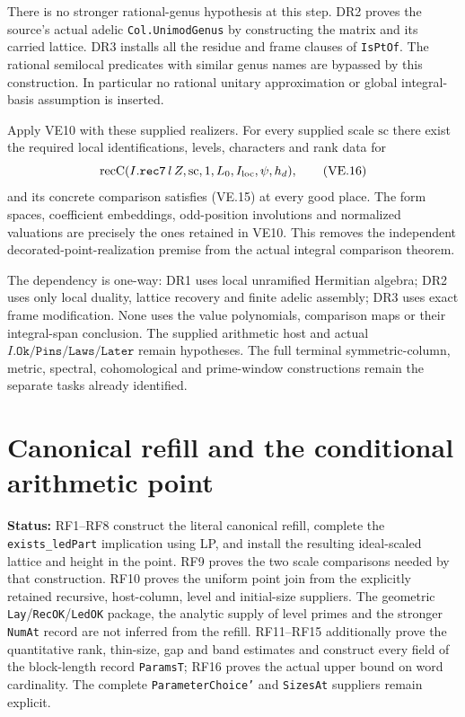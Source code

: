 \documentclass[11pt,a4paper]{article}
\numberwithin{equation}{section}
\theoremstyle{remark}\newtheorem{remark}[theorem]{Remark}
\newcommand{\status}[1]{\textbf{Status:} #1}
\begin{document}
There is no stronger rational-genus hypothesis at this step.
DR2 proves the source's actual adelic \texttt{Col.UnimodGenus}
by constructing the matrix and its carried lattice. DR3 installs
all the residue and frame clauses of \texttt{IsPtOf}. The rational
semilocal predicates with similar genus names are bypassed by this
construction. In particular no rational unitary approximation or
global integral-basis assumption is inserted.

Apply VE10 with these supplied realizers. For every supplied scale
$\mathrm{sc}$ there exist the required local identifications, levels,
characters and rank data for
\[
 \operatorname{recC}(I.\texttt{rec7}\,l\,Z,
                  \mathrm{sc},1,L_0,I_{\rm loc},\psi,h_d),
                                                        \tag{VE.16}
\]
and its concrete comparison satisfies (VE.15) at every good place.
The form spaces, coefficient embeddings, odd-position involutions
and normalized valuations are precisely the ones retained in VE10.
This removes the independent decorated-point-realization premise
from the actual integral comparison theorem.

The dependency is one-way: DR1 uses local unramified Hermitian algebra;
DR2 uses only local duality, lattice recovery and finite adelic assembly;
DR3 uses exact frame modification. None uses the value polynomials,
comparison maps or their integral-span conclusion. The supplied
arithmetic host and actual $I.\texttt{Ok}/\texttt{Pins}/
\texttt{Laws}/\texttt{Later}$ remain hypotheses. The full terminal
symmetric-column, metric, spectral, cohomological and prime-window
constructions remain the separate tasks already identified.


\section{Canonical refill and the conditional arithmetic point}
\label{sec:canonical-refill}

\status{RF1--RF8 construct the literal canonical refill, complete the
\texttt{exists\_\allowbreak ledPart} implication using LP, and install the resulting
ideal-scaled lattice and height in the point. RF9 proves the two scale
comparisons needed by that construction. RF10 proves the uniform point join
from the explicitly retained recursive, host-column, level and initial-size
suppliers. The geometric \texttt{Lay}/\texttt{RecOK}/\texttt{LedOK} package,
the analytic supply of level primes and the stronger \texttt{NumAt} record
are not inferred from the refill. RF11--RF15 additionally prove the
quantitative rank, thin-size, gap and band estimates and construct every
field of the block-length record \texttt{ParamsT}; RF16 proves the
actual upper bound on word cardinality. The complete
\texttt{ParameterChoice'} and \texttt{SizesAt} suppliers remain explicit.}
\end{document}
